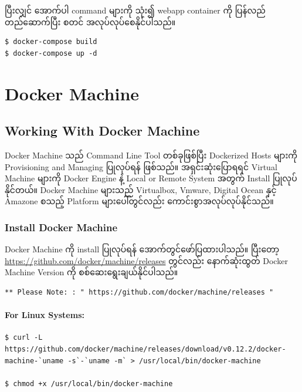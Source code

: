 \documentclass{article}
\begin{document}
ပြီးလျှင် အောက်ပါ command များကို သုံး၍ webapp container ကို ပြန်လည်
တည်ဆောက်ပြီး စတင် အလုပ်လုပ်စေနိုင်ပါသည်။

\begin{verbatim}
$ docker-compose build
$ docker-compose up -d
\end{verbatim}

\pagebreak

\section{Docker Machine}\label{docker-machine}

\subsection{Working With Docker
Machine}\label{working-with-docker-machine}

Docker Machine သည် Command Line Tool တစ်ခုဖြစ်ပြီး Dockerized Hosts
များကို Provisioning and Managing ပြုလုပ်ရန် ဖြစ်သည်။ အရှင်းဆုံးပြောရရင်
Virtual Machine များကို Docker Engine နဲ့ Local or Remote System အတွက်
Install ပြုလုပ်နိုင်တယ်။ Docker Machine များသည် Virtualbox, Vmware,
Digital Ocean နှင့် Amazone စသည့် Platform များပေါ်တွင်လည်း
ကောင်းစွာအလုပ်လုပ်နိုင်သည်။

\subsubsection{Install Docker Machine}\label{install-docker-machine}

Docker Machine ကို install ပြုလုပ်ရန် အောက်တွင်ဖော်ပြထားပါသည်။ ပြီးတော့
\href{https://github.com/docker/machine/releases}{\url{https://github.com/docker/machine/releases}}
တွင်လည်း နောက်ဆုံးထွတ် Docker Machine Version ကို
စစ်ဆေးရွေးချယ်နိုင်ပါသည်။

\begin{verbatim}
** Please Note: : " https://github.com/docker/machine/releases " 
\end{verbatim}

\paragraph{For Linux Systems:}\label{for-linux-systems}

\begin{verbatim}
$ curl -L https://github.com/docker/machine/releases/download/v0.12.2/docker-machine-`uname -s`-`uname -m` > /usr/local/bin/docker-machine

$ chmod +x /usr/local/bin/docker-machine
\end{verbatim}
\end{document}
